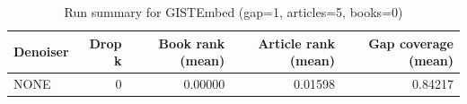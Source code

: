 \begin{table}
\caption{Run summary for GISTEmbed (gap=1, articles=5, books=0)}
\label{tab:summary_gap1_gistembed_a5_b0}
\begin{tabular}{lrrrr}
\toprule
Denoiser & Drop k & Book rank (mean) & Article rank (mean) & Gap coverage (mean) \\
\midrule
NONE & 0 & 0.00000 & 0.01598 & 0.84217 \\
\bottomrule
\end{tabular}
\end{table}